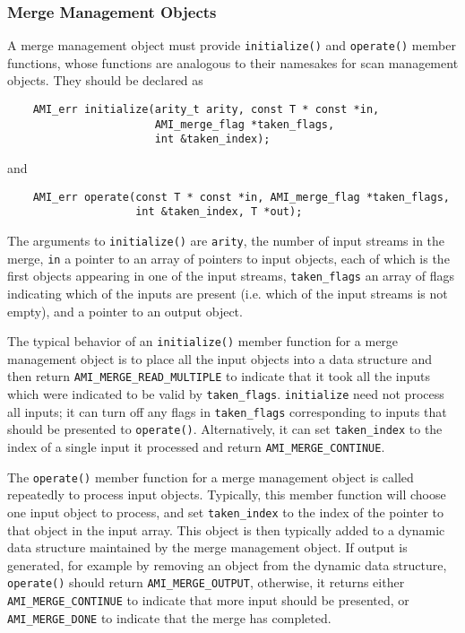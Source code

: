 \subsubsection{Merge Management Objects}  
 A merge management object
must provide \verb|initialize()| and \verb|operate()| member
functions, whose functions are analogous to their namesakes for scan
management objects.  They should be declared as
\begin{verbatim}
    AMI_err initialize(arity_t arity, const T * const *in,
                       AMI_merge_flag *taken_flags,
                       int &taken_index);
\end{verbatim}
and
\begin{verbatim}
    AMI_err operate(const T * const *in, AMI_merge_flag *taken_flags,
                    int &taken_index, T *out);
\end{verbatim}
The arguments to \verb|initialize()| are \verb|arity|, the number of
input streams in the merge, \verb|in| a pointer to an array of
pointers to input objects, each of which is the first objects appearing
in one of the input streams,  \verb|taken_flags| an array of flags
indicating which of the inputs are present (i.e. which of the input
streams is not empty), and a pointer to an output object.

The typical behavior of an \verb|initialize()| member function for a
merge management object is to place all the input objects into a data
structure and then return \verb|AMI_MERGE_READ_MULTIPLE| to indicate
that it took all the inputs which were indicated to be valid by
\verb|taken_flags|.  \verb|initialize| need not process all inputs; it
can turn off any flags in \verb|taken_flags| corresponding to inputs
that should be presented to \verb|operate()|.  Alternatively, it can
set \verb|taken_index| to the index of a single input it processed and
return \verb|AMI_MERGE_CONTINUE|.

The \verb|operate()| member function for a merge management object is
called repeatedly to process input objects.  Typically, this member
function will choose one input object to process, and set
\verb|taken_index| to the index of the pointer to that object in the input
array.  This object is then typically added to a dynamic data structure
maintained by the merge management object.  If output is generated, for
example by removing an object from the dynamic data structure,
\verb|operate()| should return \verb|AMI_MERGE_OUTPUT|, otherwise, it
returns either \verb|AMI_MERGE_CONTINUE| to indicate that more input should
be presented, or \verb|AMI_MERGE_DONE| to indicate that the merge has
completed.

